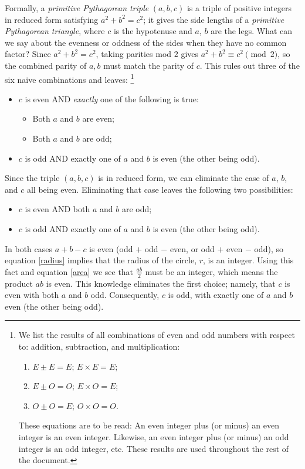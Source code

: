 \documentclass[12pt]{article}
\theoremstyle{plain}
\begin{document}
Formally, a {\em primitive Pythagorean triple\/} $(a,b,c)$ is a triple of positive
integers in reduced form satisfying $a^2 + b^2 = c^2$; it gives the side
lengths of a {\em primitive Pythagorean triangle\/}, where $c$ is the
hypotenuse and $a$, $b$ are the legs.
What can we say about the evenness or oddness of the sides when they have no
common factor? Since $a^2 + b^2 = c^2$, taking parities mod $2$ gives
$a^2 + b^2 \equiv c^2 \pmod 2$, so the combined parity of $a, b$ must match
the parity of $c$. This rules out three of the six naive combinations and
leaves:%
\footnote{We list the results of all combinations of even and odd numbers with
respect to: addition, subtraction, and multiplication:
\begin{enumerate}
    \item $E \pm E = E$; $E \times E = E$;
    \item $E \pm O = O$; $E \times O = E$;
    \item $O \pm O = E$; $O \times O = O$.
\end{enumerate}
These equations are to be read: An even integer plus (or minus) an even integer
is an even integer.
Likewise, an even integer plus (or minus) an odd integer is an odd integer, etc.
These results are used throughout the rest of the document.
}
\begin{itemize}
    \item $c$ is even AND {\em exactly\/} one of the following is true:
        \begin{itemize}
            \item Both $a$ and $b$ are even;
            \item Both $a$ and $b$ are odd;
        \end{itemize}
    \item $c$ is odd AND exactly one of $a$ and $b$ is even (the other being odd).
\end{itemize}
Since the triple $(a,b,c)$ is in reduced form, we can eliminate the case of
$a$, $b$, and $c$ all being even. Eliminating that case leaves the following
two possibilities:
\begin{itemize}
  \item $c$ is even AND both $a$ and $b$ are odd;
  \item $c$ is odd AND exactly one of $a$ and $b$ is even (the other being odd).
\end{itemize}

In both cases $a + b - c$ is even (odd $+$ odd $-$ even,
or odd $+$ even $-$ odd),
so equation \eqref{radius} implies that the radius of the circle, $r$,
is an integer.
Using this fact and equation \eqref{area} we see that $\frac{ab}{2}$ must be
an integer, which means the product $ab$ is even.
This knowledge eliminates the first choice; namely, that $c$ is even with
both $a$ and $b$ odd. Consequently, $c$ is odd, with exactly one of $a$ and $b$ even
(the other being odd).
\end{document}
